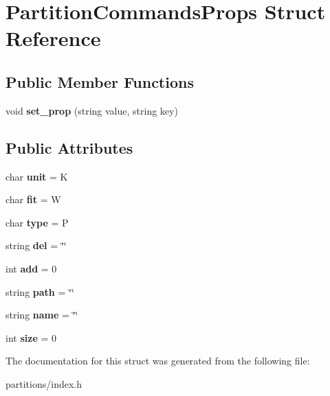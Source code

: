 \hypertarget{structPartitionCommandsProps}{}\section{Partition\+Commands\+Props Struct Reference}
\label{structPartitionCommandsProps}
\subsection*{Public Member Functions}
\begin{DoxyCompactItemize}
\item 
\mbox{\label{structPartitionCommandsProps_ae651c1a821faf660336734491c000386}} 
void {\bfseries set\+\_\+prop} (string value, string key)
\end{DoxyCompactItemize}
\subsection*{Public Attributes}
\begin{DoxyCompactItemize}
\item 
\mbox{\label{structPartitionCommandsProps_a9103cf7e770c8f891e166cdb3db0f2bd}} 
char {\bfseries unit} = \textquotesingle{}K\textquotesingle{}
\item 
\mbox{\label{structPartitionCommandsProps_a762b7c87fead9c7d8ac12f8cc35c2123}} 
char {\bfseries fit} = \textquotesingle{}W\textquotesingle{}
\item 
\mbox{\label{structPartitionCommandsProps_ae9a0d8e2650497f35e18fbc6690916ee}} 
char {\bfseries type} = \textquotesingle{}P\textquotesingle{}
\item 
\mbox{\label{structPartitionCommandsProps_a1597c9aabc2b060f307593ba3d384ad0}} 
string {\bfseries del} = \char`\"{}\char`\"{}
\item 
\mbox{\label{structPartitionCommandsProps_a9f240134fccb021ffff611a0b95e9fa0}} 
int {\bfseries add} = 0
\item 
\mbox{\label{structPartitionCommandsProps_a7e21544f8b1582caaa9af0b0bd292e41}} 
string {\bfseries path} = \char`\"{}\char`\"{}
\item 
\mbox{\label{structPartitionCommandsProps_a82c59b2331c5eb1b672f2fd13e2e4df0}} 
string {\bfseries name} = \char`\"{}\char`\"{}
\item 
\mbox{\label{structPartitionCommandsProps_a31ec32f260c6473a4eca5aac84cfe078}} 
int {\bfseries size} = 0
\end{DoxyCompactItemize}


The documentation for this struct was generated from the following file\+:\begin{DoxyCompactItemize}
\item 
partitions/index.\+h\end{DoxyCompactItemize}
